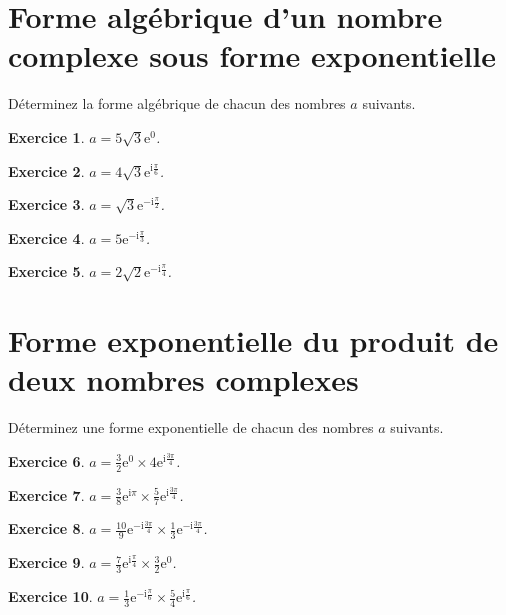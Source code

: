 \documentclass[a4paper]{article}
\newtheorem{Exercice}{Exercice}
\begin{document}
\begin{minipage}{0.45\linewidth}
  \section*{Forme alg\'ebrique d'un nombre complexe sous forme exponentielle}%
     D\'eterminez la forme alg\'ebrique de chacun des nombres $a$ suivants.\begin{Exercice}
$\displaystyle a=5 \sqrt{3}\mathrm{e}^{0}$.
\end{Exercice}
\begin{Exercice}
$\displaystyle a=4 \sqrt{3}\mathrm{e}^{\mathrm{i}\frac{\pi }{6}}$.
\end{Exercice}
\begin{Exercice}
$\displaystyle a=\sqrt{3}\mathrm{e}^{-\mathrm{i}\frac{\pi }{2}}$.
\end{Exercice}
\begin{Exercice}
$\displaystyle a=5\mathrm{e}^{-\mathrm{i}\frac{\pi }{3}}$.
\end{Exercice}
\begin{Exercice}
$\displaystyle a=2 \sqrt{2}\mathrm{e}^{-\mathrm{i}\frac{\pi }{4}}$.
\end{Exercice}
\end{minipage}\hfill
\begin{minipage}{0.45\linewidth}
  \section*{Forme exponentielle du produit de deux nombres complexes}%
     D\'eterminez une forme exponentielle de chacun des nombres $a$ suivants.\begin{Exercice}
$\displaystyle a=\frac{3}{2}\mathrm{e}^{0}\times 4\mathrm{e}^{\mathrm{i}\frac{3 \pi }{4}}$.
\end{Exercice}
\begin{Exercice}
$\displaystyle a=\frac{3}{8}\mathrm{e}^{\mathrm{i}\pi }\times \frac{5}{7}\mathrm{e}^{\mathrm{i}\frac{3 \pi }{4}}$.
\end{Exercice}
\begin{Exercice}
$\displaystyle a=\frac{10}{9}\mathrm{e}^{-\mathrm{i}\frac{3 \pi }{4}}\times \frac{1}{3}\mathrm{e}^{-\mathrm{i}\frac{3 \pi }{4}}$.
\end{Exercice}
\begin{Exercice}
$\displaystyle a=\frac{7}{3}\mathrm{e}^{\mathrm{i}\frac{\pi }{4}}\times \frac{3}{2}\mathrm{e}^{0}$.
\end{Exercice}
\begin{Exercice}
$\displaystyle a=\frac{1}{3}\mathrm{e}^{-\mathrm{i}\frac{\pi }{6}}\times \frac{5}{4}\mathrm{e}^{\mathrm{i}\frac{\pi }{6}}$.
\end{Exercice}

\end{minipage}\\
\end{document}
